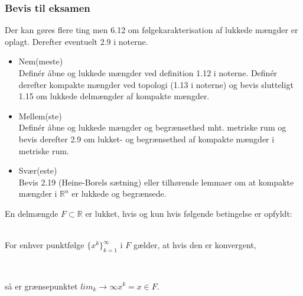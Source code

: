 \subsubsection{Bevis til eksamen}
Der kan gøres flere ting men 6.12 om følgekarakterisation af lukkede mængder er oplagt. Derefter eventuelt 2.9 i noterne.
\begin{itemize}
\setlength\itemsep{0em}
\item Nem(meste)\\
Definér åbne og lukkede mængder ved definition 1.12 i noterne. Definér derefter kompakte mængder ved topologi (1.13 i noterne) og bevis slutteligt 1.15 om lukkede delmængder af kompakte mængder.
\item Mellem(ste)\\
Definér åbne og lukkede mængder og begrænsethed mht. metriske rum og bevis derefter 2.9 om lukket- og begrænsethed af kompakte mængder i metriske rum.
\item Svær(este)\\
Bevis 2.19 (Heine-Borels sætning) eller tilhørende lemmaer om at kompakte mængder i $\mathbb{R}^n$ er lukkede og begrænsede.
\end{itemize}
\clearpage
\begin{theorem}
En delmængde $F\subset\mathbb{R}$ er lukket, hvis og kun hvis følgende betingelse er opfyldt:\\\\
\centerline{For enhver punktfølge $\{x^k\}_{k=1}^\infty$ i $F$ gælder, at hvis den er konvergent,}\\ \centerline{så er grænsepunktet $lim_k\to\infty x^k=x\in F$.}
\end{theorem}
